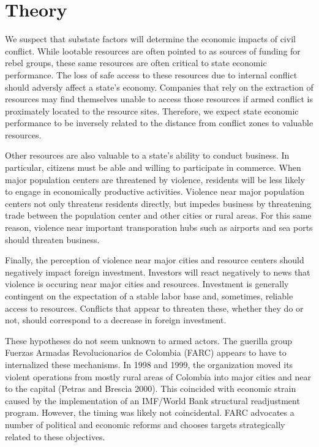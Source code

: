\section{Theory}
\label{theory}


We suspect that substate factors will determine the economic impacts of civil conflict.  While lootable resources are often pointed to as sources of funding for rebel groups, these same resources are often critical to state economic performance.  The loss of safe access to these resources due to internal conflict should adversly affect a state's economy.  Companies that rely on the extraction of resources may find themselves unable to access those resources if armed conflict is proximately located to the resource sites.  Therefore, we expect state economic performance to be inversely related to the distance from conflict zones to valuable resources.

Other resources are also valuable to a state's ability to conduct business.  In particular, citizens must be able and willing to participate in commerce.  When major population centers are threatened by violence, residents will be less likely to engage in economically productive activities.  Violence near major population centers not only threatens residents directly, but impedes business by threatening trade between the population center and other cities or rural areas.  For this same reason, violence near important transporation hubs such as airports and sea ports should threaten business.

Finally, the perception of violence near major cities and resource centers should negatively impact foreign investment.  Investors will react negatively to news that violence is occuring near major cities and resources.  Investment is generally contingent on the expectation of a stable labor base and, sometimes, reliable access to resources.  Conflicts that appear to threaten these, whether they do or not, should correspond to a decrease in foreign investment.

These hypotheses do not seem unknown to armed actors.  The guerilla group Fuerzas Armadas Revolucionarios de Colombia (FARC) appears to have to internalized these mechanisms.  In 1998 and 1999, the organization moved its violent operations from mostly rural areas of Colombia into major cities and near to the capital (Petras and Brescia 2000).  This coincided with economic strain caused by the implementation of an IMF/World Bank structural readjustment program.  However, the timing was likely not coincidental.  FARC advocates a number of political and economic reforms and chooses targets strategically related to these objectives.

